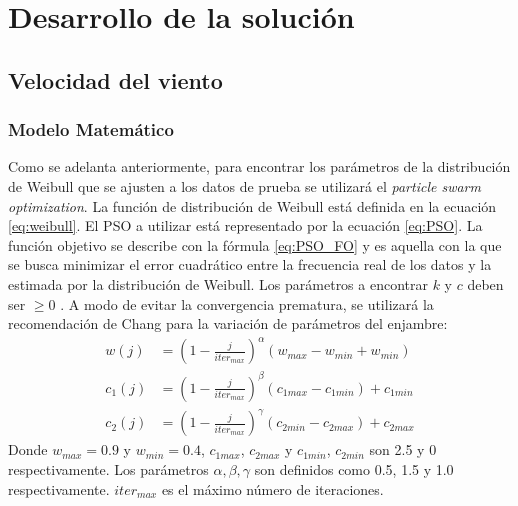 
\chapter{Desarrollo de la solución}

\section{Velocidad del viento}
\subsection{Modelo Matemático} \label{ss:Modelo_Mat}
Como se adelanta anteriormente, para encontrar los parámetros de la distribución de Weibull que se ajusten a los datos de prueba se utilizará el \emph{particle swarm optimization}. La función de distribución de Weibull está definida en la ecuación \ref{eq:weibull}. El PSO a utilizar está representado por la ecuación \ref{eq:PSO}. La función objetivo se describe con la fórmula \ref{eq:PSO_FO} y es aquella con la que se busca minimizar el error cuadrático entre la frecuencia real de los datos y la estimada por la distribución de Weibull. Los parámetros a encontrar $k$ y $c$ deben ser $\geq 0$ . A modo de evitar la convergencia prematura, se utilizará la recomendación de Chang \cite{Chang10_2} para la variación de parámetros del enjambre:
\begin{align}\label{eq:VariationParameters}
    w(j) &= (1 - \frac{j}{iter_{max}})^{\alpha}(w_{max} - w_{min} + w_{min})\\
    c_{1}(j) &= (1 - \frac{j}{iter_{max}})^{\beta}(c_{1max} - c_{1min}) + c_{1min}\\
    c_{2}(j) &= (1 - \frac{j}{iter_{max}})^{\gamma}(c_{2min} - c_{2max}) + c_{2max}
\end{align}    
Donde $w_{max} = 0.9$ y $w_{min} = 0.4$, $c_{1max}$, $c_{2max}$ y $c_{1min}$, $c_{2min}$ son 2.5 y 0 respectivamente. Los parámetros $\alpha, \beta, \gamma$ son definidos como 0.5, 1.5 y 1.0 respectivamente. $iter_{max}$ es el máximo número de iteraciones.

